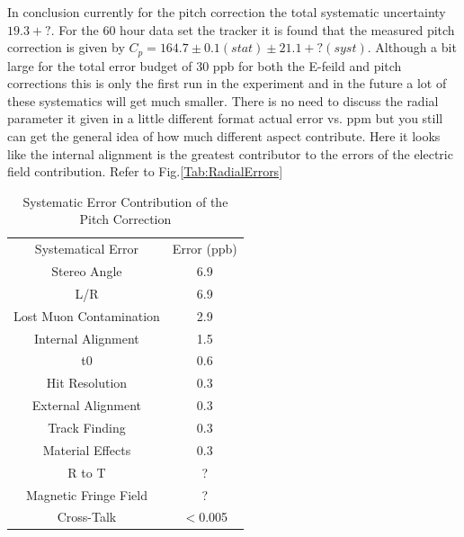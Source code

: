 \documentclass[./Thesis]{subfiles}
\begin{document}
		In conclusion currently for the pitch correction the total systematic uncertainty $19.3+?$. For the 60 hour data set the tracker it is found that the measured pitch correction is given by $C_p=164.7\pm0.1(stat)\pm21.1+?(syst)$. Although a bit large for the total error budget of 30 ppb for both the E-feild and pitch corrections this is only the first run in the experiment and in the future a lot of these systematics will get much smaller. There is no need to discuss the radial parameter it given in a little different format actual error vs. ppm but you still can get the general idea of how much different aspect contribute. Here it looks like the internal alignment is the greatest contributor to the errors of the electric field contribution. Refer to Fig.\ref{Tab:RadialErrors}
	
		

\begin{table}%
\begin{center}
\caption{Systematic Error Contribution of the Pitch Correction}
\label{Tab:PitchErrors}
\begin{tabular}{ c c }
\hline
Systematical Error		&   Error (ppb)\\
Stereo Angle			&    6.9 \\
L/R					&    6.9 \\
Lost Muon Contamination &	2.9 \\
Internal Alignment		& 	1.5 \\
t$0$					&	0.6\\
Hit Resolution			&	0.3\\
External Alignment		&	0.3 \\
Track Finding			&	0.3 \\
Material Effects			&	0.3 \\
R to T				& 	? \\
Magnetic Fringe Field	&	? \\
Cross-Talk			&	$<$0.005 \\
\hline
\end{tabular}
\end{center}
\end{table}
\end{document}
